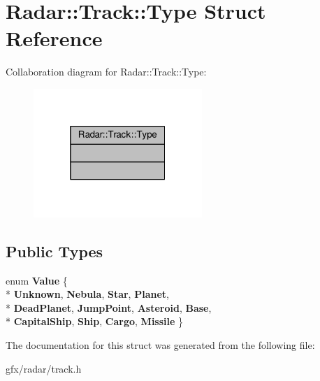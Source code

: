 \hypertarget{structRadar_1_1Track_1_1Type}{}\section{Radar\+:\+:Track\+:\+:Type Struct Reference}
\label{structRadar_1_1Track_1_1Type}


Collaboration diagram for Radar\+:\+:Track\+:\+:Type\+:
\nopagebreak
\begin{figure}[H]
\begin{center}
\leavevmode
\includegraphics[width=181pt]{db/df6/structRadar_1_1Track_1_1Type__coll__graph}
\end{center}
\end{figure}
\subsection*{Public Types}
\begin{DoxyCompactItemize}
\item 
enum {\bfseries Value} \{ \\*
{\bfseries Unknown}, 
{\bfseries Nebula}, 
{\bfseries Star}, 
{\bfseries Planet}, 
\\*
{\bfseries Dead\+Planet}, 
{\bfseries Jump\+Point}, 
{\bfseries Asteroid}, 
{\bfseries Base}, 
\\*
{\bfseries Capital\+Ship}, 
{\bfseries Ship}, 
{\bfseries Cargo}, 
{\bfseries Missile}
 \}\hypertarget{structRadar_1_1Track_1_1Type_a75face2062967067a74f222ecb1921a6}{}\label{structRadar_1_1Track_1_1Type_a75face2062967067a74f222ecb1921a6}

\end{DoxyCompactItemize}


The documentation for this struct was generated from the following file\+:\begin{DoxyCompactItemize}
\item 
gfx/radar/track.\+h\end{DoxyCompactItemize}
